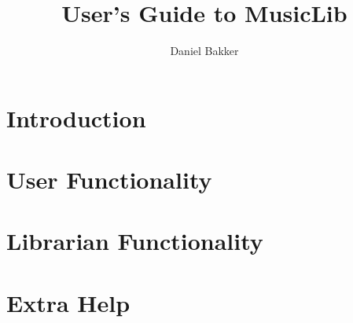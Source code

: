\documentclass{article}
\title{User's Guide to MusicLib}
\author{Daniel Bakker}
\begin{document}
\maketitle
\tableofcontents

\section{Introduction}

\section{User Functionality}

\section{Librarian Functionality}

\section{Extra Help}
\end{document}
